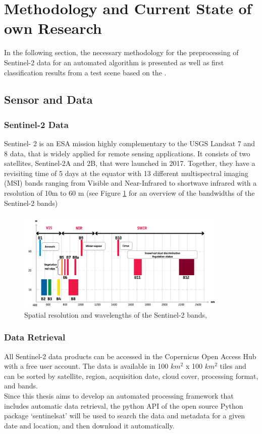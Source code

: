 \documentclass[12pt]{article}
\begin{document}
\section{Methodology and Current State of own Research}
In the following section, the necessary methodology for the preprocessing of Sentinel-2 data for an automated algorithm is presented as well as first classification results from a test scene based on the .
\subsection{Sensor and Data}
\subsubsection{Sentinel-2 Data}
Sentinel- 2 is an ESA mission highly complementary to the USGS Landsat 7 and 8 data, that is widely applied for remote sensing applications. It consists of two satellites, Sentinel-2A and 2B, that were launched in 2017. Together, they have a revisiting time of 5 days at the equator with 13 different multispectral imaging (MSI) bands ranging from Visible and Near-Infrared to shortwave infrared with a resolution of 10m to 60 m (see Figure \ref{fig:spectral_bands} for an overview of the bandwidths of the Sentinel-2 bands)

\begin{figure}[H]
\centering
\includegraphics[width=0.9\textwidth]{sentinel_bands}

\caption{Spatial resolution and wavelengths of the Sentinel-2 bands, \cite{ESA_bulletin}}
\label{fig:spectral_bands}
\end{figure}

\subsubsection{Data Retrieval}
 All Sentinel-2 data products can be accessed in the Copernicus Open Access Hub with a free user account. The data is available in 100 $km^2$ x 100 $km^2$ tiles and can be sorted by satellite, region, acquisition date, cloud cover, processing format, and bands. \\
Since this thesis aims to develop an automated processing framework that includes automatic data retrieval, the python API of the open source Python package ‘sentinelsat’ will be used to search the data and metadata for a given date and location, and then download it automatically.
\end{document}
